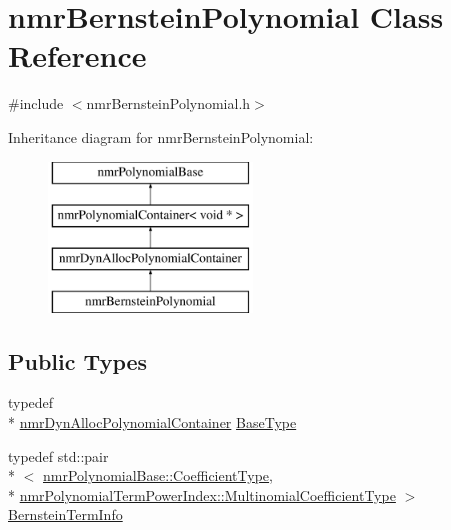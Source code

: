 \hypertarget{classnmr_bernstein_polynomial}{\section{nmr\-Bernstein\-Polynomial Class Reference}
\label{classnmr_bernstein_polynomial}
}


{\ttfamily \#include $<$nmr\-Bernstein\-Polynomial.\-h$>$}

Inheritance diagram for nmr\-Bernstein\-Polynomial\-:\begin{figure}[H]
\begin{center}
\leavevmode
\includegraphics[height=4.000000cm]{de/d41/classnmr_bernstein_polynomial}
\end{center}
\end{figure}
\subsection*{Public Types}
\begin{DoxyCompactItemize}
\item 
typedef \\*
\hyperlink{classnmr_dyn_alloc_polynomial_container}{nmr\-Dyn\-Alloc\-Polynomial\-Container} \hyperlink{classnmr_bernstein_polynomial_a8a0eb11ca4ee788e0f3714dd0e1f2e53}{Base\-Type}
\item 
typedef std\-::pair\\*
$<$ \hyperlink{classnmr_polynomial_base_a8693efdfc8585ccb49abea69f74f3eef}{nmr\-Polynomial\-Base\-::\-Coefficient\-Type}, \\*
\hyperlink{classnmr_polynomial_term_power_index_a09f482da776cfb829e26ad1fb381ab94}{nmr\-Polynomial\-Term\-Power\-Index\-::\-Multinomial\-Coefficient\-Type} $>$ \hyperlink{classnmr_bernstein_polynomial_ad8d87d00b90dcd2de08a43e90c07a0a6}{Bernstein\-Term\-Info}
\end{DoxyCompactItemize}
